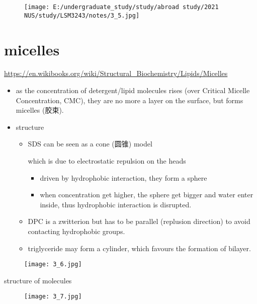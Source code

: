 \begin{figure}
	\centering
	\texttt{[image: E:/undergraduate\_study/study/abroad study/2021 NUS/study/LSM3243/notes/3\_5.jpg]}
	\caption{}
\end{figure}

\hypertarget{micelles}{%
	\section{micelles}\label{micelles}}

\url{https://en.wikibooks.org/wiki/Structural_Biochemistry/Lipids/Micelles}

\begin{itemize}
	\item
	as the concentration of detergent/lipid molecules rises (over Critical
	Micelle Concentration, CMC), they are no more a layer on the surface,
	but forms micelles (胶束).
	\item
	structure
	
	\begin{itemize}
		\item
		SDS can be seen as a cone (圆锥) model
		
		which is due to electrostatic repulsion on the heads 
		
		\begin{itemize}
			\item
			driven by hydrophobic interaction, they form a sphere
			\item
			when concentration get higher, the sphere get bigger and water
			enter inside, thus hydrophobic interaction is disrupted.
		\end{itemize}
		\item
		DPC is a zwitterion but has to be parallel (replusion direction) to
		avoid contacting hydrophobic groups.
		\item
		triglyceride may form a cylinder, which favours the formation of
		bilayer.
	\end{itemize}
\end{itemize}

\begin{figure}
	\centering
	\texttt{[image: 3\_6.jpg]}
	\caption{}
\end{figure}

structure of molecules

\begin{figure}
	\centering
	\texttt{[image: 3\_7.jpg]}
	\caption{}
\end{figure}

